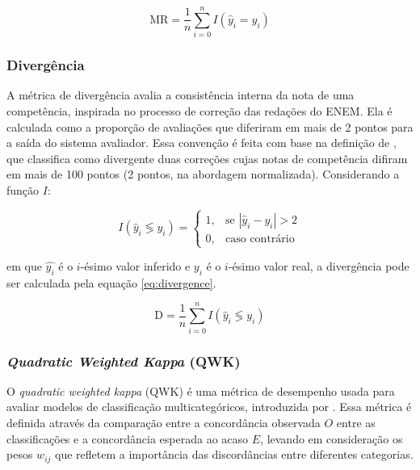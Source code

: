 \begin{equation}
    \label{eq:exact_match_ratio}
    \text{MR} = \frac{1}{n} \sum_{i=0}^{n} I(\hat{y}_{i} = y_{i})
\end{equation}

\subsubsection{Divergência}

A métrica de divergência avalia a consistência interna da nota de uma competência, inspirada no processo de correção das redações do ENEM. Ela é calculada como a proporção de avaliações que diferiram em mais de 2 pontos para a saída do sistema avaliador. Essa convenção é feita com base na definição de \citet{cartilha-redacao}, que classifica como divergente duas correções cujas notas de competência difiram em mais de 100 pontos (2 pontos, na abordagem normalizada). Considerando a função $I$:

\begin{equation}
    I(\hat{y}_{i} \lessgtr y_{i}) = \begin{cases}
        1, & \text{se } |\hat{y}_{i} - y_{i}| > 2 \\
        0, & \text{caso contrário}
    \end{cases}
\end{equation}

em que $\hat{y_{i}}$ é o $i$-ésimo valor inferido e $y_{i}$ é o $i$-ésimo valor real, a divergência pode ser calculada pela equação \ref{eq:divergence}.

\begin{equation}
    \label{eq:divergence}
    \text{D} = \frac{1}{n} \sum_{i=0}^{n} I(\hat{y}_{i} \lessgtr y_{i})
\end{equation}

\subsubsection{\textit{Quadratic Weighted Kappa} (QWK)}

O \textit{quadratic weighted kappa} (QWK) é uma métrica de desempenho usada para avaliar modelos de classificação multicategóricos, introduzida por \citet{cohen-1968-qwk}. Essa métrica é definida através da comparação entre a concordância observada $O$ entre as classificações e a concordância esperada ao acaso $E$, levando em consideração os pesos $w_{ij}$ que refletem a importância das discordâncias entre diferentes categorias.

